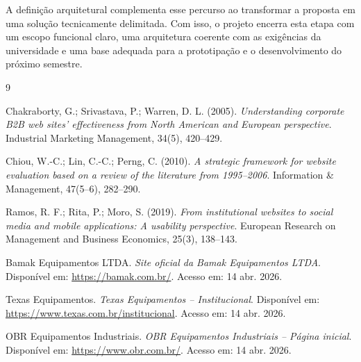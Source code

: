 \documentclass[portuguese]{sbcreviews-2025}
\begin{document}
A definição arquitetural complementa esse percurso ao transformar a proposta em uma solução tecnicamente delimitada. Com isso, o projeto encerra esta etapa com um escopo funcional claro, uma arquitetura coerente com as exigências da universidade e uma base adequada para a prototipação e o desenvolvimento do próximo semestre.

\begin{thebibliography}{9}
\small
\setlength{\itemsep}{0.25em}
\setlength{\parskip}{0pt}

Chakraborty, G.; Srivastava, P.; Warren, D. L. (2005).
\textit{Understanding corporate B2B web sites' effectiveness from North American and European perspective}.
Industrial Marketing Management, 34(5), 420--429.

Chiou, W.-C.; Lin, C.-C.; Perng, C. (2010).
\textit{A strategic framework for website evaluation based on a review of the literature from 1995--2006}.
Information \& Management, 47(5--6), 282--290.

Ramos, R. F.; Rita, P.; Moro, S. (2019).
\textit{From institutional websites to social media and mobile applications: A usability perspective}.
European Research on Management and Business Economics, 25(3), 138--143.

Bamak Equipamentos LTDA.
\textit{Site oficial da Bamak Equipamentos LTDA}.
Disponível em: \url{https://bamak.com.br/}. Acesso em: 14 abr. 2026.

Texas Equipamentos.
\textit{Texas Equipamentos -- Institucional}.
Disponível em: \url{https://www.texas.com.br/institucional}. Acesso em: 14 abr. 2026.

OBR Equipamentos Industriais.
\textit{OBR Equipamentos Industriais -- Página inicial}.
Disponível em: \url{https://www.obr.com.br/}. Acesso em: 14 abr. 2026.

\end{thebibliography}
\end{document}
